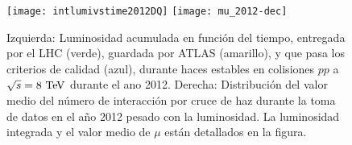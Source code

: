 \begin{figure}[!htbp]
  \centering

  \texttt{[image: intlumivstime2012DQ]}
  \texttt{[image: mu\_2012-dec]}

  \caption{Izquierda: Luminosidad acumulada en función del tiempo, entregada por el LHC (verde),
    guardada por ATLAS (amarillo), y que pasa los criterios de calidad (azul),
    durante haces estables en colisiones $pp$ a $\sqrt{s}=8\tev$ durante el ano 2012\cite{lumiplots}.
    Derecha: Distribución del valor medio del número de interacción  por cruce
    de haz durante la toma de datos en el a\~no 2012 pesado con la luminosidad.
    La luminosidad integrada y el valor medio de $\mu$ están detallados en la figura.
  }
  \label{fig:lumi}

\end{figure}
